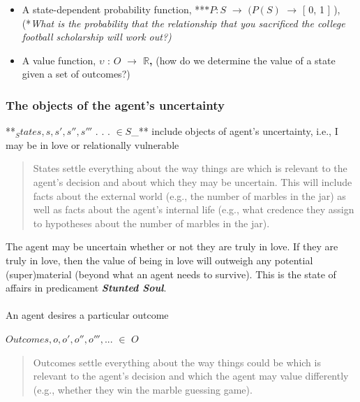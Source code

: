 \documentclass[
  letterpaper,
  DIV=11,
  numbers=noendperiod]{scrartcl}
\makeatletter
\let\oldparagraph\paragraph
\renewcommand{\paragraph}{
    \@ifstar
      \xxxParagraphStar
      \xxxParagraphNoStar
  }
\newcommand{\xxxParagraphStar}[1]{\oldparagraph*{#1}\mbox{}}
\newcommand{\xxxParagraphNoStar}[1]{\oldparagraph{#1}\mbox{}}
\providecommand{\tightlist}{%
  \setlength{\itemsep}{0pt}\setlength{\parskip}{0pt}}
\makeatother
\begin{document}
\begin{itemize}
\tightlist
\item
  A state-dependent probability function, **\(*P: S\) \(\rightarrow\)
  \((P(S)\) \(\rightarrow\) {[} 0, 1 {]} ), (*\emph{What is the
  probability that the relationship that you sacrificed the college
  football scholarship will work out?)}
\item
  A value function, \(\upsilon\) : \(O\) \textbf{\(\rightarrow\)
  \(\mathbb{R}\),} (how do we determine the value of a state given a set
  of outcomes?)
\end{itemize}

\subsubsection{The objects of the agent's
uncertainty}\label{the-objects-of-the-agents-uncertainty}

**\(_States, s, s', s'', s'''\) . . . \(\in S\)\_** include objects of
agent's uncertainty, i.e., I may be in love or relationally vulnerable

\begin{quote}
States settle everything about the way things are which is relevant to
the agent's decision and about which they may be uncertain. This will
include facts about the external world (e.g., the number of marbles in
the jar) as well as facts about the agent's internal life (e.g., what
credence they assign to hypotheses about the number of marbles in the
jar).
\end{quote}

The agent may be uncertain whether or not they are truly in love. If
they are truly in love, then the value of being in love will outweigh
any potential (super)material (beyond what an agent needs to survive).
This is the state of affairs in predicament \emph{\textbf{Stunted
Soul}}.

\paragraph{An agent desires a particular
outcome}\label{an-agent-desires-a-particular-outcome}

\(Outcomes, o, o', o'', o''', . . .\) \(\in\) \(O\)

\begin{quote}
Outcomes settle everything about the way things could be which is
relevant to the agent's decision and which the agent may value
differently (e.g., whether they win the marble guessing game).
\end{quote}
\end{document}
